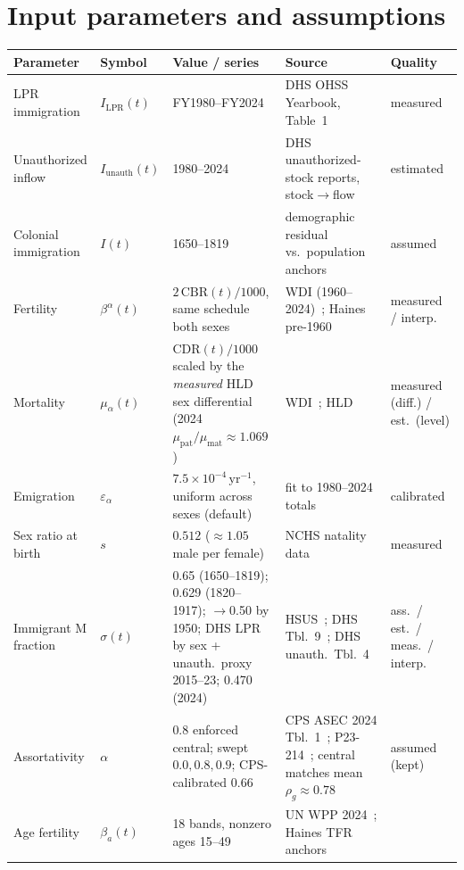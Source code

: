 \documentclass[11pt,a4paper]{article}
\begin{document}
\section{Input parameters and assumptions}
{\footnotesize
\begin{longtable}{@{}lllp{3.6cm}p{2.9cm}@{}}
\toprule
Parameter & Symbol & Value / series & Source & Quality \\
\midrule
\endhead
\bottomrule
\endfoot
LPR immigration & $I_{\mathrm{LPR}}(t)$ & FY1980--FY2024 &
  DHS OHSS Yearbook, Table~1~\cite{dhs-yearbook} & measured \\
Unauthorized inflow & $I_{\mathrm{unauth}}(t)$ & 1980--2024 &
  DHS unauthorized-stock reports, stock$\to$flow~\cite{dhs-unauth} & estimated \\
Colonial immigration & $I(t)$ & 1650--1819 &
  demographic residual vs.\ population anchors~\cite{census-hsus} & assumed \\
Fertility & $\beta^\alpha(t)$ & $2\,\mathrm{CBR}(t)/1000$,
  same schedule both sexes &
  WDI (1960--2024)~\cite{wdi}; Haines pre-1960~\cite{haines} & measured / interp.\ \\
Mortality & $\mu_\alpha(t)$ & $\mathrm{CDR}(t)/1000$ scaled by the
  \emph{measured} HLD sex differential (2024 $\mu_{\mathrm{pat}}/
  \mu_{\mathrm{mat}}\approx1.069$) &
  WDI~\cite{wdi}; HLD~\cite{hld} & measured (diff.) / est.\ (level) \\
Emigration & $\varepsilon_\alpha$ & $7.5\times10^{-4}\,\mathrm{yr}^{-1}$,
  uniform across sexes (default) &
  fit to 1980--2024 totals~\cite{census-decennial} & calibrated \\
Sex ratio at birth & $s$ & $0.512$ ($\approx 1.05$ male per female) &
  NCHS natality data~\cite{nchs-natality} & measured \\
Immigrant M fraction & $\sigma(t)$ & 0.65 (1650--1819); 0.629
  (1820--1917); $\to$0.50 by 1950; DHS LPR by sex + unauth.\ proxy
  2015--23; 0.470 (2024) &
  HSUS~\cite{hsus-immig}; DHS Tbl.~9~\cite{dhs-lpr-sex};
  DHS unauth.\ Tbl.~4~\cite{dhs-unauth-table4} & ass.\ / est.\ / meas.\ / interp.\ \\
Assortativity & $\alpha$ & $0.8$ enforced central; swept $0.0,0.8,0.9$;
  CPS-calibrated $0.66$ &
  CPS ASEC 2024 Tbl.~1~\cite{cps-asec-2024}; P23-214~\cite{p23-214};
  central matches mean $\rho_g\approx0.78$ & assumed (kept) \\
Age fertility & $\beta_a(t)$ & 18 bands, nonzero ages 15--49 &
  UN WPP 2024~\cite{unwpp-2024}; Haines TFR anchors~\cite{haines} &

\end{longtable}}
\end{document}
